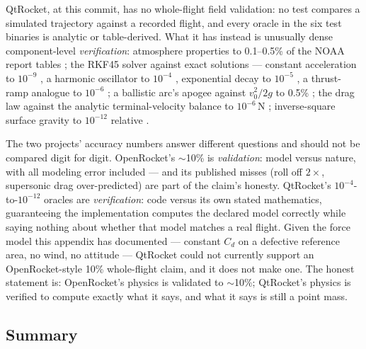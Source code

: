 QtRocket, at this commit, has no whole-flight field validation: no test compares a simulated
trajectory against a recorded flight, and every oracle in the six test binaries is analytic
or table-derived. What it has instead is unusually dense component-level
\emph{verification}: atmosphere properties to 0.1--0.5\% of the NOAA report tables
; the RKF45 solver against exact solutions
--- constant acceleration to $10^{-9}$ , a harmonic
oscillator to $10^{-4}$ , exponential decay to
$10^{-5}$ , a thrust-ramp analogue to $10^{-6}$
; a ballistic arc's apogee against $v_0^2/2g$ to
0.5\% ; the drag law against the analytic
terminal-velocity balance to $10^{-6}$\,N ;
inverse-square surface gravity to $10^{-12}$ relative
.

\begin{keyinsight}
The two projects' accuracy numbers answer different questions and should not be compared
digit for digit. OpenRocket's $\sim$10\% is \emph{validation}: model versus nature, with all
modeling error included --- and its published misses (roll off $2\times$, supersonic drag
over-predicted) are part of the claim's honesty. QtRocket's $10^{-4}$-to-$10^{-12}$ oracles
are \emph{verification}: code versus its own stated mathematics, guaranteeing the
implementation computes the declared model correctly while saying nothing about whether that
model matches a real flight. Given the force model this appendix has documented --- constant
$C_d$ on a defective reference area, no wind, no attitude --- QtRocket could not currently
support an OpenRocket-style 10\% whole-flight claim, and it does not make one. The honest
statement is: OpenRocket's physics is validated to $\sim$10\%; QtRocket's physics is
verified to compute exactly what it says, and what it says is still a point mass.
\end{keyinsight}

\subsection{Summary}\label{app:or-methods-summary-sec}

